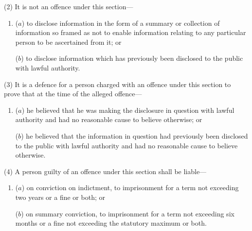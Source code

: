 \documentclass[12pt,a4paper]{article}
\begin{document}
(2) It is not an offence under this section—
\begin{enumerate}\item[]
($a$) to disclose information in the form of a summary or collection of information so framed as not to enable information relating to any particular person to be ascertained from it; or

($b$) to disclose information which has previously been disclosed to the public with lawful authority.
\end{enumerate}

(3) It is a defence for a person charged with an offence under this section to prove that at the time of the alleged offence—
\begin{enumerate}\item[]
($a$) he believed that he was making the disclosure in question with lawful authority and had no reasonable cause to believe otherwise; or

($b$) he believed that the information in question had previously been disclosed to the public with lawful authority and had no reasonable cause to believe otherwise.
\end{enumerate}

(4) A person guilty of an offence under this section shall be liable—
\begin{enumerate}\item[]
($a$) on conviction on indictment, to imprisonment for a term not exceeding two years or a fine or both; or

($b$) on summary conviction, to imprisonment for a term not exceeding six months or a fine not exceeding the statutory maximum or both.
\end{enumerate}

%
%
%
%
\end{document}
